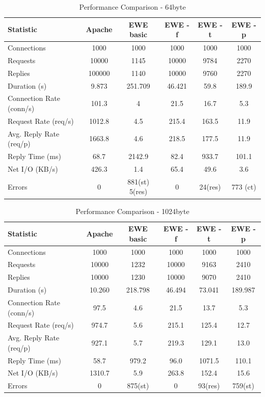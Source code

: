 \documentclass{article}
\begin{document}
\begin{table}[h]
\begin{tabular}{|l|c|c|c|c|c|}
\hline
Statistic & Apache & EWE basic & EWE -f & EWE -t & EWE -p \\
\hline
Connections & 1000 & 1000 & 1000 & 1000 & 1000 \\
Requests & 10000 & 1145 & 10000 & 9784 & 2270 \\
Replies & 100000 & 1140 & 10000 & 9760 & 2270 \\
Duration (s)& 9.873 & 251.709 & 46.421 & 59.8 & 189.9 \\
Connection Rate (conn/s)& 101.3 & 4 & 21.5 & 16.7 & 5.3 \\
Request Rate (req/s)& 1012.8 & 4.5 & 215.4 & 163.5 & 11.9 \\
Avg. Reply Rate (req/p)& 1663.8 & 4.6 &218.5 & 177.5 & 11.9 \\
Reply Time (ms)& 68.7 & 2142.9 & 82.4 & 933.7 & 101.1 \\
Net I/O (KB/s)& 426.3 & 1.4 & 65.4 & 49.6 & 3.6 \\
Errors & 0 & 881(st) 5(res) & 0 & 24(res)& 773 (ct) \\
\hline
\end{tabular}
\caption{Performance Comparison - 64byte}\label{perf64}
\end{table}

\begin{table}[h]
\begin{tabular}{|l|c|c|c|c|c|}
\hline
Statistic & Apache & EWE basic & EWE -f & EWE -t & EWE -p \\
\hline
Connections & 1000& 1000 & 1000 & 1000 & 1000\\
Requests & 10000& 1232 & 10000 & 9163 & 2410\\
Replies & 10000& 1230 & 10000 & 9070 & 2410\\
Duration (s)& 10.260& 218.798 & 46.494 & 73.041 & 189.987\\
Connection Rate (conn/s)& 97.5& 4.6 & 21.5 & 13.7 & 5.3\\
Request Rate (req/s)& 974.7 & 5.6 & 215.1 & 125.4 & 12.7\\
Avg. Reply Rate (req/p)& 927.1 & 5.7 & 219.3 & 129.1 & 13.0\\
Reply Time (ms)& 58.7 & 979.2 & 96.0 & 1071.5 & 110.1\\
Net I/O (KB/s)& 1310.7 & 5.9 & 263.8 & 152.4 & 15.6\\
Errors & 0 & 875(st) & 0 & 93(res) & 759(st)\\
\hline
\end{tabular}
\caption{Performance Comparison - 1024byte}\label{perf1024}
\end{table}
\end{document}
